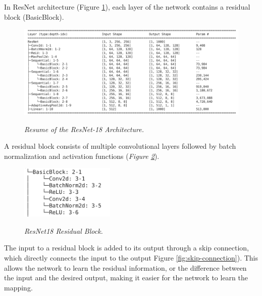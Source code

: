 In ResNet architecture (Figure \ref{fig:resnet-18-arch}), each layer of the
network contains a residual block (BasicBlock).

\begin{figure}[H]
  \begin{adjustbox}{width=\textwidth, trim={0.2cm 0pt 1.5cm 0pt}, clip}
    \centering
    \includegraphics[width=\textwidth]{imatges/methodological_contribution/residual-blocks.png}
  \end{adjustbox}
  \caption[Resume of the ResNet-18 Architecture]{\textit{Resume of the
  ResNet-18 Architecture. }}
  {\label{fig:resnet-18-arch}}
\end{figure}

A residual block consists of multiple convolutional layers followed by batch
normalization and activation functions (\textit{Figure
\ref{fig:resnet-18-residual-block}}).

\newpage

\begin{figure}[H]
  \centering
  \includegraphics[width=0.4\textwidth]{imatges/methodological_contribution/basic-block.png}
  \caption[ResNet18 Residual Block]{\textit{ResNet18 Residual Block. }}
  {\label{fig:resnet-18-residual-block}}
\end{figure}

The input to a residual block is added to its output through a skip connection,
which directly connects the input to the output Figure
\ref{fig:skip-connection}). This allows the network to learn the residual
information, or the difference between the input and the desired output, making
it easier for the network to learn the mapping.

